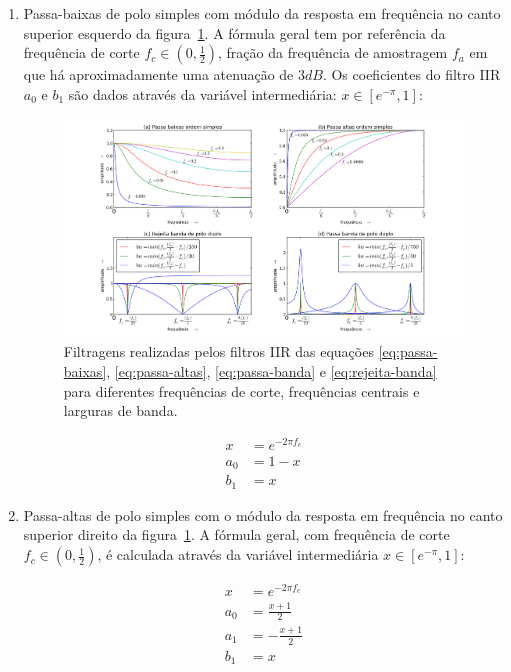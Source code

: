 \begin{enumerate}
\item Passa-baixas de polo simples com módulo da resposta em frequência no canto superior esquerdo da figura~\ref{fig:iir}. A fórmula geral tem
por referência da frequência de corte $f_c \in (0,\frac{1}{2})$,
fração da frequência de amostragem $f_a$
em que há aproximadamente uma atenuação de $3dB$.
Os coeficientes do filtro IIR
$a_0$ e $b_1$ 
são dados através da variável intermediária: $x \in [e^{-\pi},1]$:

\begin{figure}[h!]
    \centering
        \includegraphics[width=\textwidth]{figuras/iir___}
    \caption{Filtragens realizadas pelos filtros IIR das equações \ref{eq:passa-baixas}, \ref{eq:passa-altas}, \ref{eq:passa-banda} e \ref{eq:rejeita-banda} para diferentes frequências de corte, frequências centrais e larguras de banda.}
        \label{fig:iir}
\end{figure}


\begin{equation}\label{eq:passa-baixas}
\begin{split}
x & =e^{-2\pi f_c} \\
a_0 & =  1-x \\
b_1 & =  x
\end{split}
\end{equation}

\item Passa-altas de polo simples com o módulo da resposta em frequência no canto superior direito da figura~\ref{fig:iir}. A fórmula geral,
com frequência de corte $f_c \in (0,\frac{1}{2})$, é calculada através da variável
intermediária $x \in [e^{-\pi},1]$:


\begin{equation}\label{eq:passa-altas}
\begin{split}
x & =e^{-2\pi f_c} \\
a_0 & =  \frac{x+1}{2} \\
a_1 & =  -\frac{x+1}{2} \\
b_1 & =  x
\end{split}
\end{equation}



\end{enumerate}

